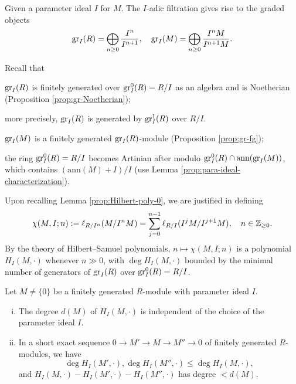 Given a parameter ideal $I$ for $M$. The $I$-adic filtration gives rise to the graded objects
\[ \operatorname{gr}_I(R) = \bigoplus_{n \geq 0} \frac{I^n}{I^{n+1}}, \quad \operatorname{gr}_I(M) = \bigoplus_{n \geq 0} \frac{I^n M}{I^{n+1}M}. \]

Recall that
\begin{compactitem}
	\item $\operatorname{gr}_I(R)$ is finitely generated over $\operatorname{gr}^0_I(R) = R/I$ as an algebra and is Noetherian (Proposition \ref{prop:gr-Noetherian});
	\item more precisely, $\operatorname{gr}_I(R)$ is generated by $\operatorname{gr}^1_I(R)$ over $R/I$.
	\item $\operatorname{gr}_I(M)$ is a finitely generated $\operatorname{gr}_I(R)$-module (Proposition \ref{prop:gr-fg});
	\item the ring $\operatorname{gr}^0_I(R) = R/I$ becomes Artinian after modulo $\operatorname{gr}^0_I(R) \cap \text{ann}(\operatorname{gr}_I(M))$, which contains $(\text{ann}(M)+I)/I$ (use Lemma \ref{prop:para-ideal-characterization}).
\end{compactitem}
Upon recalling Lemma \ref{prop:Hilbert-poly-0}, we are justified in defining
\[ \chi(M, I; n) := \ell_{R/I^n}(M/I^n M) = \sum_{j=0}^{n-1} \ell_{R/I}(I^j M/I^{j+1} M), \quad n \in \mathbb{Z}_{\geq 0}. \]
By the theory of Hilbert--Samuel polynomials, $n \mapsto \chi(M,I; n)$ is a polynomial $H_I(M, \cdot)$ whenever $n \gg 0$, with $\deg H_I(M, \cdot)$ bounded by the minimal number of generators of $\operatorname{gr}_I(R)$ over $\operatorname{gr}^0_I(R) = R/I$.
\begin{lemma}\label{prop:Hilbert-poly-I}
	Let $M \neq \{0\}$ be a finitely generated $R$-module with parameter ideal $I$.
	\begin{enumerate}[(i)]
		\item The degree $d(M)$ of $H_I(M, \cdot)$ is independent of the choice of the parameter ideal $I$.
		\item In a short exact sequence $0 \to M' \to M \to M'' \to 0$ of finitely generated $R$-modules, we have
		\[ \deg H_I(M', \cdot), \deg H_I(M'', \cdot) \leq \deg H_I(M, \cdot), \]
		and $H_I(M, \cdot) - H_I(M', \cdot) - H_I(M'', \cdot)$ has degree $< d(M)$.
	\end{enumerate}
\end{lemma}
